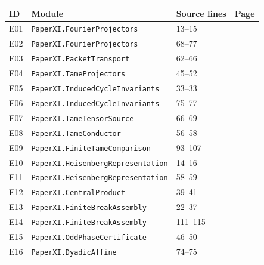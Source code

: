 \documentclass[10pt,oneside]{book}
\begin{document}
\begin{longtable}{@{}p{}p{}p{}p{}@{}}\toprule ID&Module&Source lines&Page\\\midrule\endhead

E01&\nolinkurl{PaperXI.FourierProjectors}&13--15&\pageref{guide:E01}\\

E02&\nolinkurl{PaperXI.FourierProjectors}&68--77&\pageref{guide:E02}\\

E03&\nolinkurl{PaperXI.PacketTransport}&62--66&\pageref{guide:E03}\\

E04&\nolinkurl{PaperXI.TameProjectors}&45--52&\pageref{guide:E04}\\

E05&\nolinkurl{PaperXI.InducedCycleInvariants}&33--33&\pageref{guide:E05}\\

E06&\nolinkurl{PaperXI.InducedCycleInvariants}&75--77&\pageref{guide:E06}\\

E07&\nolinkurl{PaperXI.TameTensorSource}&66--69&\pageref{guide:E07}\\

E08&\nolinkurl{PaperXI.TameConductor}&56--58&\pageref{guide:E08}\\

E09&\nolinkurl{PaperXI.FiniteTameComparison}&93--107&\pageref{guide:E09}\\

E10&\nolinkurl{PaperXI.HeisenbergRepresentation}&14--16&\pageref{guide:E10}\\

E11&\nolinkurl{PaperXI.HeisenbergRepresentation}&58--59&\pageref{guide:E11}\\

E12&\nolinkurl{PaperXI.CentralProduct}&39--41&\pageref{guide:E12}\\

E13&\nolinkurl{PaperXI.FiniteBreakAssembly}&22--37&\pageref{guide:E13}\\

E14&\nolinkurl{PaperXI.FiniteBreakAssembly}&111--115&\pageref{guide:E14}\\

E15&\nolinkurl{PaperXI.OddPhaseCertificate}&46--50&\pageref{guide:E15}\\

E16&\nolinkurl{PaperXI.DyadicAffine}&74--75&\pageref{guide:E16}\\


\end{longtable}
\end{document}

